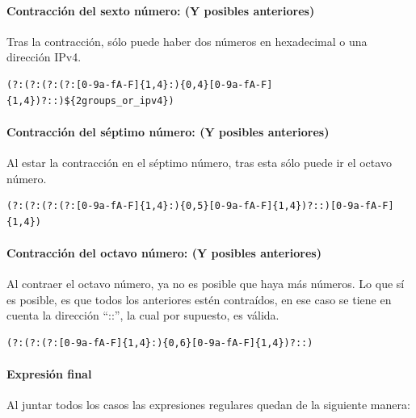 \paragraph{Contracción del sexto número: (Y posibles anteriores)}
Tras la contracción, sólo puede haber dos números en hexadecimal o una dirección IPv4.
\begin{lstlisting}[breaklines, caption={Expresión regular para capturar dirección IPv6 con el sexto número contraido (Y posibles anteriores)}, label={Regex:ipv6_6}, captionpos=b]
(?:(?:(?:(?:[0-9a-fA-F]{1,4}:){0,4}[0-9a-fA-F]{1,4})?::)${2groups_or_ipv4})
\end{lstlisting}

\paragraph{Contracción del séptimo número: (Y posibles anteriores)}
Al estar la contracción en el séptimo número, tras esta sólo puede ir el octavo número.
\begin{lstlisting}[breaklines, caption={Expresión regular para capturar dirección IPv6 con el sétimo número contraido (Y posibles anteriores)}, label={Regex:ipv6_7}, captionpos=b]
(?:(?:(?:(?:[0-9a-fA-F]{1,4}:){0,5}[0-9a-fA-F]{1,4})?::)[0-9a-fA-F]{1,4})
\end{lstlisting}

\paragraph{Contracción del octavo número: (Y posibles anteriores)}
Al contraer el octavo número, ya no es posible que haya más números.
Lo que sí es posible, es que todos los anteriores estén contraídos, en ese caso se tiene en cuenta la dirección “::”, la cual por supuesto, es válida.
\begin{lstlisting}[breaklines, caption={Expresión regular para capturar dirección IPv6 con el octavo número contraido (Y posibles anteriores)}, label={Regex:ipv6_8}, captionpos=b]
(?:(?:(?:[0-9a-fA-F]{1,4}:){0,6}[0-9a-fA-F]{1,4})?::)
\end{lstlisting}

\paragraph{Expresión final}
Al juntar todos los casos las expresiones regulares quedan de la siguiente manera: 

